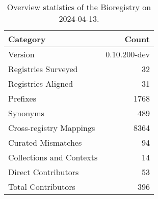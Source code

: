 \begin{table}
\caption{Overview statistics of the Bioregistry on 2024-04-13.}
\label{tab:bioregistry-summary}
\begin{tabular}{lr}
\toprule
Category & Count \\
\midrule
Version & 0.10.200-dev \\
Registries Surveyed & 32 \\
Registries Aligned & 31 \\
Prefixes & 1768 \\
Synonyms & 489 \\
Cross-registry Mappings & 8364 \\
Curated Mismatches & 94 \\
Collections and Contexts & 14 \\
Direct Contributors & 53 \\
Total Contributors & 396 \\
\bottomrule
\end{tabular}
\end{table}

